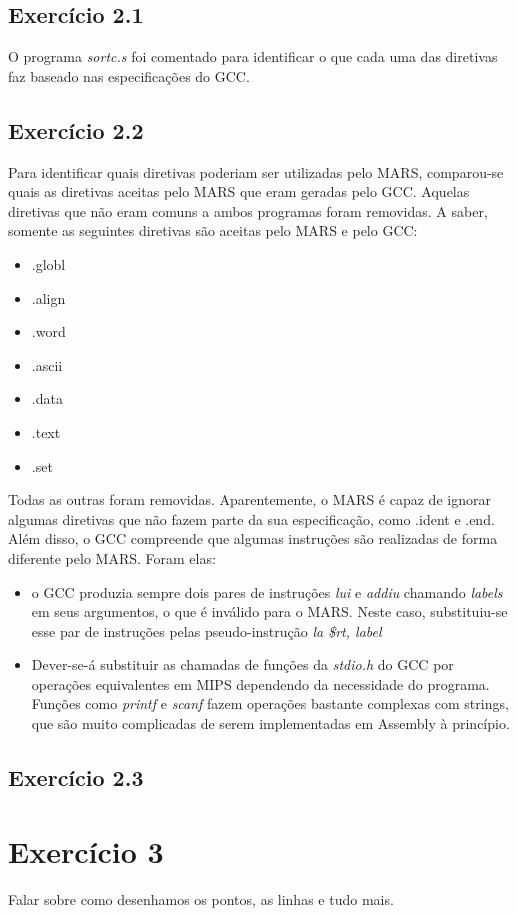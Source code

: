 \documentclass[12pt, a4paper, twoside]{article}
\begin{document}
\subsection{Exercício 2.1}

O programa \textit{sortc.s} foi comentado para identificar o que cada uma das diretivas faz baseado nas especificações do GCC.

\subsection{Exercício 2.2}

Para identificar quais diretivas poderiam ser utilizadas pelo MARS, comparou-se quais as diretivas aceitas pelo MARS que eram geradas pelo GCC. Aquelas diretivas que não eram comuns a ambos programas foram removidas. A saber, somente as seguintes diretivas são aceitas pelo MARS e pelo GCC:

\begin{itemize}
    \item .globl
    \item .align
    \item .word
    \item .ascii
    \item .data
    \item .text
    \item .set
\end{itemize}

Todas as outras foram removidas. Aparentemente, o MARS é capaz de ignorar algumas diretivas que não fazem parte da sua especificação, como .ident e .end. Além disso, o GCC compreende que algumas instruções são realizadas de forma diferente pelo MARS. Foram elas:

\begin{itemize}
    \item o GCC produzia sempre dois pares de instruções \textit{lui} e \textit{addiu} chamando \textit{labels} em seus argumentos, o que é inválido para o MARS. Neste caso, substituiu-se esse par de instruções pelas pseudo-instrução \textit{la \$rt, label}
    \item Dever-se-á substituir as chamadas de funções da \textit{stdio.h} do GCC por operações equivalentes em MIPS dependendo da necessidade do programa. Funções como \textit{printf} e \textit{scanf} fazem operações bastante complexas com strings, que são muito complicadas de serem implementadas em Assembly à princípio.
\end{itemize}

\subsection{Exercício 2.3}


\section{Exercício 3}

Falar sobre como desenhamos os pontos, as linhas e tudo mais.
\end{document}
